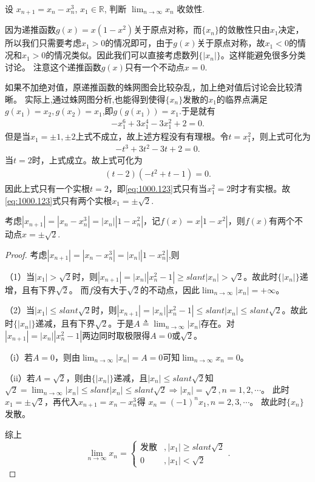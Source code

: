 \documentclass[../../main.tex]{subfiles}
\begin{document}
\begin{example}
设 $x_{n+1} = x_n - x_n^3$, $x_1 \in \mathbb{R}$, 判断 $\lim_{n \to \infty} x_n$ 收敛性.
\end{example}
\begin{note}
因为递推函数$g(x) = x(1 - x^2)$关于原点对称，而$\{ x_n \}$的敛散性只由$x_1$决定，所以我们只需要考虑$x_1 > 0$的情况即可，由于$g(x)$关于原点对称，故$x_1 < 0$的情况和$x_1 > 0$的情况类似。因此我们可以直接考虑数列$\{ |x_n| \}$。这样能避免很多分类讨论。
注意这个递推函数$g(x)$只有一个不动点$x=0$.

如果不加绝对值，原递推函数的蛛网图会比较杂乱，加上绝对值后讨论会比较清晰。
实际上,通过蛛网图分析,也能得到使得$\{x_n\}$发散的$x_1$的临界点满足$g(x_1)=x_2,g(x_2)=x_1$,即$g(g(x_1))=x_1$.于是就有
\begin{align}
-x_1^6 + 3x_1^4 - 3x_1^2 + 2 = 0.\label{eq:1000.123}
\end{align}
但是当$x_1 = \pm 1, \pm 2$上式不成立，故上述方程没有有理根。令$t = x_1^2$，则上式可化为
\begin{align*}
-t^3 + 3t^2 - 3t + 2 = 0.
\end{align*}
当$t = 2$时，上式成立。故上式可化为
\begin{align*}
(t - 2)(-t^2 + t - 1) = 0.
\end{align*}
因此上式只有一个实根$t = 2$，即\eqref{eq:1000.123}式只有当$x_1^2 = 2$时才有实根。故\eqref{eq:1000.123}式只有两个实根$x_1 = \pm \sqrt{2}$.

考虑$|x_{n+1}| = |x_n - x_n^3| = |x_n| |1 - x_n^2|$，记$f(x) = x |1 - x^2|$，则$f(x)$有两个不动点$x=\pm \sqrt{2}.$
\end{note}
\begin{proof}
考虑$|x_{n+1}| = |x_n - x_n^3| = |x_n| |1 - x_n^2|$,则

（1）当$|x_1| > \sqrt{2}$时，则$|x_{n+1}| = |x_n| |x_n^2 - 1| \geqslant slant |x_n| > \sqrt{2}$。故此时$\{ |x_n| \}$递增，且有下界$\sqrt{2}$。
而$f$没有大于$\sqrt{2}$的不动点，因此$\lim_{n \to \infty} |x_n| = +\infty$。

（2）当$|x_1| \leqslant slant \sqrt{2}$时，则$|x_{n+1}| = |x_n| |x_n^2 - 1| \leqslant slant |x_n| \leqslant slant \sqrt{2}$。故此时$\{ |x_n| \}$递减，且有下界$\sqrt{2}$。于是$A \triangleq \lim_{n \to \infty} |x_n|$存在。对$|x_{n+1}| = |x_n| |x_n^2 - 1|$两边同时取极限得$A = 0$或$\sqrt{2}$。

（i）若$A = 0$，则由$\lim_{n \to \infty} |x_n| = A = 0$可知$\lim_{n \to \infty} x_n = 0$。

（ii）若$A = \sqrt{2}$，则由$\{ |x_n| \}$递减，且$|x_n| \leqslant slant \sqrt{2}$知
$\sqrt{2} = \lim_{n \to \infty} |x_n| \leqslant slant |x_n| \leqslant slant \sqrt{2} \Rightarrow |x_n| = \sqrt{2}, n = 1, 2, \cdots$。
此时$x_1 = \pm \sqrt{2}$，再代入$x_{n+1} = x_n - x_n^3$得
$x_n = (-1)^n x_1, n = 2, 3, \cdots$。
故此时$\{ x_n \}$发散。

综上
$$\lim_{n \to \infty} x_n = \begin{cases} \text{发散}&, |x_1| \geqslant slant \sqrt{2} \\ 0&,|x_1| < \sqrt{2} \end{cases}.$$
\end{proof}
\end{document}
